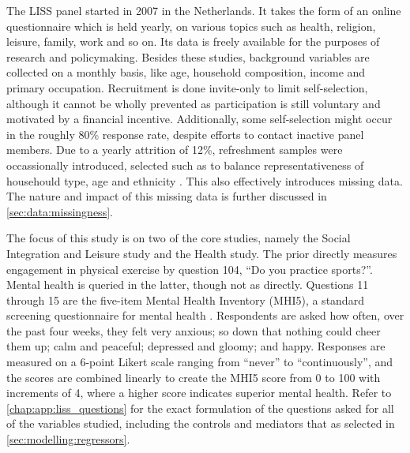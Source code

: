 The LISS panel \cite{scherpenzeel2010liss} started in 2007 in the Netherlands. It takes the form of an online questionnaire
which is held yearly, on various topics such as health, religion, leisure, family, work and so on.
Its data is freely available for the purposes of research and policymaking.
Besides these studies, background variables are collected on a monthly basis, like age, household composition,
income and primary occupation.
Recruitment is done invite-only to limit self-selection, although it cannot be wholly prevented as
participation is still voluntary and motivated by a financial incentive. Additionally, some self-selection might occur
in the roughly 80\% response rate, despite efforts to contact inactive panel members. Due to a yearly attrition of 12\%,
refreshment samples were occassionally introduced, selected such as to balance representativeness of househould type,
age and ethnicity \cite{lissdata_methodology}. This also effectively introduces missing data.
The nature and impact of this missing data is further discussed in \cref{sec:data:missingness}.

The focus of this study is on two of the core studies, namely the Social Integration and Leisure study and the Health study.
The prior directly measures engagement in physical exercise by question 104, ``Do you practice sports?''.
Mental health is queried in the latter, though not as directly. Questions 11 through 15 are the five-item Mental Health Inventory
(MHI5), a standard screening questionnaire for mental health \cite{berwick1991performance}. Respondents are asked how often, over the past four weeks,
they felt very anxious; so down that nothing could cheer them up; calm and peaceful; depressed and gloomy; and happy.
Responses are measured on a 6-point Likert scale ranging from ``never'' to ``continuously'', and the scores are combined
linearly to create the MHI5 score from 0 to 100 with increments of 4, where a higher score indicates superior mental health.
Refer to \cref{chap:app:liss_questions} for the exact formulation of the questions asked for all of the variables studied,
including the controls and mediators that as selected in \cref{sec:modelling:regressors}.


